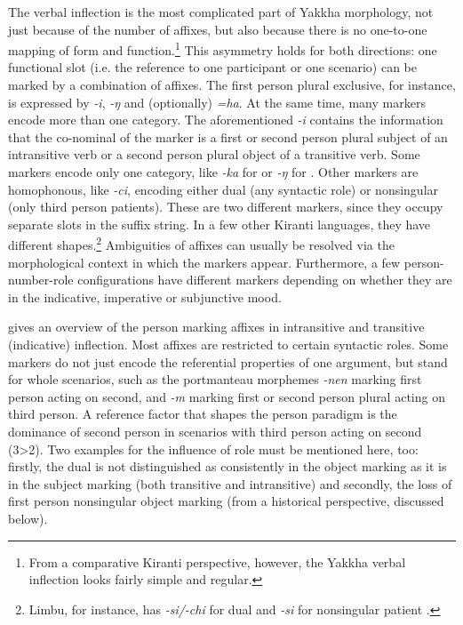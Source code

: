 The verbal inflection is the most complicated part of Yakkha morphology, not just because of the number of affixes, but also because there is no one-to-one mapping of form and function.\footnote{From a comparative Kiranti perspective, however, the Yakkha verbal inflection looks fairly simple and regular.} This asymmetry holds for both directions: one functional slot (i.e. the reference to one participant or one scenario) can be marked by a combination of affixes. The first person plural exclusive, for instance, is expressed by \emph{-i}, \emph{-ŋ} and (optionally) \emph{=ha}. At the same time, many markers  encode more than one category. The aforementioned \emph{-i} contains the information that the co-nominal of the marker is a first or second person plural subject of an intransitive verb or a second person plural object of a transitive verb.  Some markers encode only one category, like \emph{-ka} for  or \emph{-ŋ} for . Other markers are homophonous, like \emph{-ci}, encoding either dual (any syntactic role) or nonsingular (only third person patients). These are two different markers, since they occupy separate slots in the suffix string. In a few other Kiranti languages, they have different shapes.\footnote{Limbu, for instance, has \emph{-si/-chi} for dual and \emph{-si} for nonsingular patient \citep[75]{Driem1987A-grammar}.} Ambiguities of affixes can  usually be resolved via the morphological context in which the markers appear. Furthermore,  a few person-number-role configurations have different markers depending on whether they are in the indicative, imperative or subjunctive mood. 


 gives an overview of the person marking affixes in intransitive and transitive (indicative) inflection. Most affixes are restricted to certain syntactic roles. Some markers do not just encode the referential properties  of one argument, but stand for whole scenarios, such as the portmanteau morphemes \emph{-nen} marking first person acting on second, and \emph{-m} marking first or second person plural acting on third person. A reference factor that shapes the person paradigm is the dominance of second person in scenarios with third person acting on second (3>2). Two examples for the influence of role must be mentioned here, too: firstly, the dual is not distinguished as consistently in the object marking as it is in the subject marking (both transitive and intransitive) and secondly, the loss of first person nonsingular object marking (from a historical perspective, discussed below). 


